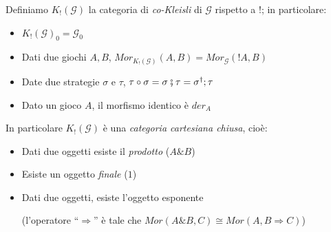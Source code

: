 \documentclass{beamer}
\begin{document}
\begin{frame}

Definiamo $K_!(\mathcal{G})$ la categoria di \emph{co-Kleisli} di $\mathcal{G}$ rispetto a $!$; in particolare:
	
	\begin{itemize}
		\item $K_!(\mathcal{G})_0 = \mathcal{G}_0$
		\item Dati due giochi $A,B$, $Mor_{K_!(\mathcal{G})}(A,B) = Mor_{\mathcal{G}}(!A,B)$
		\item Date due strategie $\sigma$ e $\tau$, $\tau \circ \sigma = \sigma \fatsemi \tau = \sigma ^\dag ; \tau$
		\item Dato un gioco $A$, il morfismo identico è $der_A$
	\end{itemize}

	In particolare $K_!(\mathcal{G})$ è una \emph{categoria cartesiana chiusa}, cioè:
	\begin{itemize}
		\item Dati due oggetti esiste il \emph{prodotto} ($A\& B$)
		\item Esiste un oggetto \emph{finale} ($1$)
		\item Dati due oggetti, esiste l'oggetto esponente 
		
		(l'operatore ``$\Rightarrow$'' è tale che $Mor(A\& B,C) \cong Mor(A,B\Rightarrow C)$)
	\end{itemize}

\end{frame}
\end{document}
